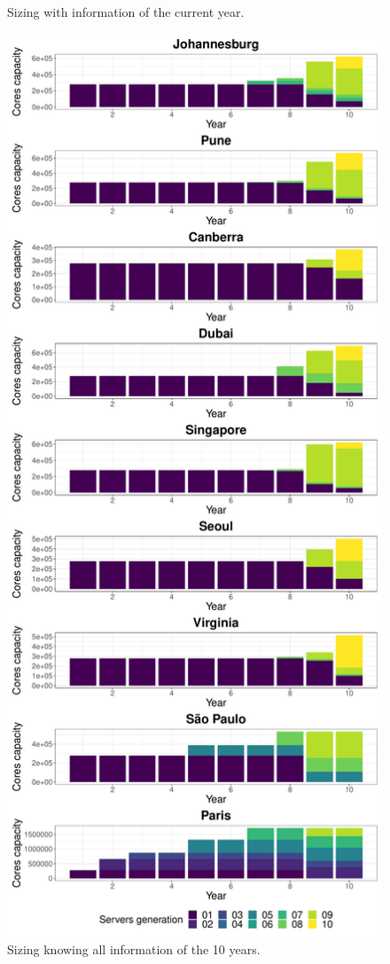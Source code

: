 \begin{figure}
\begin{minipage}{.5\textwidth}
  \caption{Sizing with information of the current year.}
  \label{fig:dc_evolution_year_by_year}
\end{minipage}%
\begin{minipage}{.5\textwidth}
  \centering
  \includegraphics[width=\linewidth]{images/dc_evolution_optimal.pdf}
  \caption{Sizing knowing all information of the 10 years.}
  \label{fig:dc_evolution_optimal}
\end{minipage}
\end{figure}


